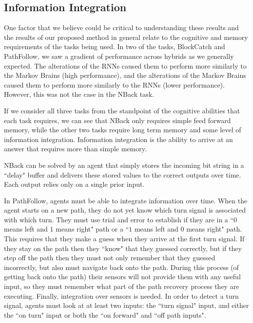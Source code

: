 \subsection{Information Integration}

One factor that we believe could be critical to understanding these results and the results of our proposed method in general relate to the cognitive and memory requirements of the tasks being used. 
In two of the tasks, BlockCatch and PathFollow, we saw a gradient of performance across hybrids as we generally expected. 
The alterations of the RNNs caused them to perform more similarly to the Markov Brains (high performance), and the alterations of the Markov Brains caused them to perform more similarly to the RNNs (lower performance). 
However, this was not the case in the NBack task.

If we consider all three tasks from the standpoint of the cognitive abilities that each task requires, we can see that NBack only requires simple feed forward memory, while the other two tasks require long term memory and some level of information integration. 
Information integration is the ability to arrive at an answer that requires more than simple memory. 

NBack can be solved by an agent that simply stores the incoming bit string in a ``delay" buffer and delivers these stored values to the correct outputs over time. 
Each output relies only on a single prior input.

In PathFollow, agents must be able to integrate information over time. 
When the agent starts on a new path, they do not yet know which turn signal is associated with which turn. 
They must use trial and error to establish if they are in a ``$0$ means left and $1$ means right" path or a ``$1$ means left and $0$ means right" path. 
This requires that they make a guess when they arrive at the first turn signal. 
If they stay on the path then they ``know" that they guessed correctly, but if they step off the path then they must not only remember that they guessed incorrectly, but also must navigate back onto the path. 
During this process (of getting back onto the path) their sensors will not provide them with any useful input, so they must remember what part of the path recovery process they are executing. 
Finally, integration over sensors is needed. 
In order to detect a turn signal, agents must look at at least two inputs: the ``turn signal" input, and either the ``on turn" input or both the ``on forward" and ``off path inputs".

